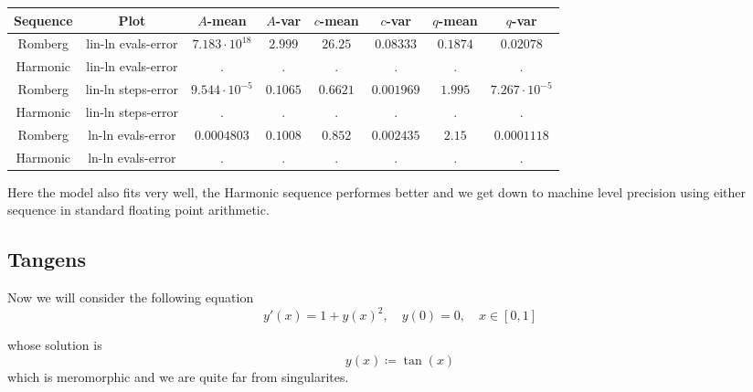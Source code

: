 \begin{table}[H]
    \centering
    \small
     \begin{tabular}{c|c||c|c|c|c|c|c}
Sequence & Plot & \(A\)-mean & \(A\)-var & \(c\)-mean & \(c\)-var & \(q\)-mean & \(q\)-var\\\hline
Romberg & lin-ln evals-error & \(7.183\cdot 10^{18}\) & \(2.999\) & \(26.25\) & \(0.08333\) & \(0.1874\) & \(0.02078\) \\
Harmonic & lin-ln evals-error & . & . & . & . & . & . \\
Romberg & lin-ln steps-error & \(9.544\cdot 10^{-5}\) & \(0.1065\) & \(0.6621\) & \(0.001969\) & \(1.995\) & \(7.267\cdot 10^{-5}\) \\
Harmonic & lin-ln steps-error & . & . & . & . & . & . \\
Romberg & ln-ln evals-error & \(0.0004803\) & \(0.1008\) & \(0.852\) & \(0.002435\) & \(2.15\) & \(0.0001118\) \\
Harmonic & ln-ln evals-error & . & . & . & . & . & . \\
    \end{tabular}
    \label{tab:my_label}
\end{table}

Here the model also fits very well, the Harmonic sequence performes better and we get down to machine level precision using either sequence in standard floating point arithmetic.

\subsection{Tangens}

Now we will consider the following equation
\begin{equation}
y'(x) = 1 + y(x)^2, \quad y(0) = 0,\quad x\in [0,1]
\end{equation}

whose solution is 
\[
y(x) \coloneqq \tan(x)
\]
which is meromorphic and we are quite far from singularites.

